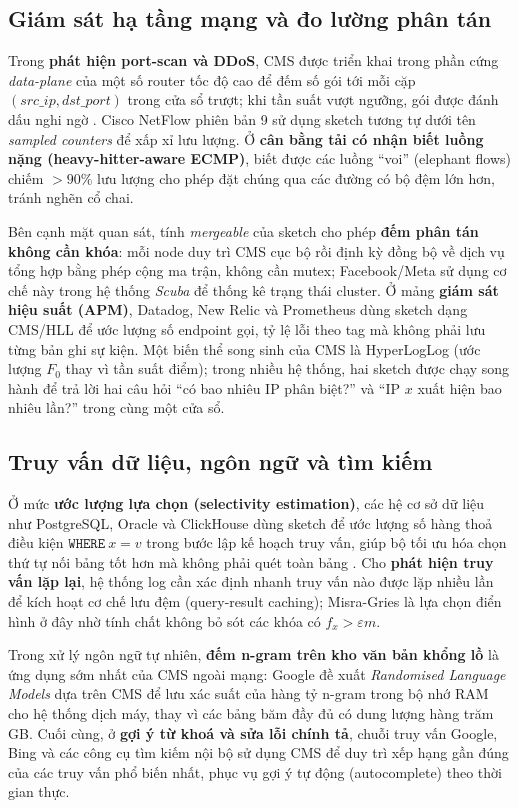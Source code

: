 \subsection{Giám sát hạ tầng mạng và đo lường phân tán}

Trong \textbf{phát hiện port-scan và DDoS}, CMS được triển khai trong phần cứng \textit{data-plane} của một số router tốc độ cao để đếm số gói tới mỗi cặp $(\textit{src\_ip}, \textit{dst\_port})$ trong cửa sổ trượt; khi tần suất vượt ngưỡng, gói được đánh dấu nghi ngờ \cite{estan2003conservative}. Cisco NetFlow phiên bản 9 sử dụng sketch tương tự dưới tên \textit{sampled counters} để xấp xỉ lưu lượng. Ở \textbf{cân bằng tải có nhận biết luồng nặng (heavy-hitter-aware ECMP)}, biết được các luồng ``voi'' (elephant flows) chiếm $>90\%$ lưu lượng cho phép đặt chúng qua các đường có bộ đệm lớn hơn, tránh nghẽn cổ chai.

Bên cạnh mặt quan sát, tính \textit{mergeable} của sketch cho phép \textbf{đếm phân tán không cần khóa}: mỗi node duy trì CMS cục bộ rồi định kỳ đồng bộ về dịch vụ tổng hợp bằng phép cộng ma trận, không cần mutex; Facebook/Meta sử dụng cơ chế này trong hệ thống \textit{Scuba} để thống kê trạng thái cluster. Ở mảng \textbf{giám sát hiệu suất (APM)}, Datadog, New Relic và Prometheus dùng sketch dạng CMS/HLL để ước lượng số endpoint gọi, tỷ lệ lỗi theo tag mà không phải lưu từng bản ghi sự kiện. Một biến thể song sinh của CMS là HyperLogLog (ước lượng $F_0$ thay vì tần suất điểm); trong nhiều hệ thống, hai sketch được chạy song hành để trả lời hai câu hỏi ``có bao nhiêu IP phân biệt?'' và ``IP $x$ xuất hiện bao nhiêu lần?'' trong cùng một cửa sổ.

\subsection{Truy vấn dữ liệu, ngôn ngữ và tìm kiếm}

Ở mức \textbf{ước lượng lựa chọn (selectivity estimation)}, các hệ cơ sở dữ liệu như PostgreSQL, Oracle và ClickHouse dùng sketch để ước lượng số hàng thoả điều kiện $\texttt{WHERE}\ x = v$ trong bước lập kế hoạch truy vấn, giúp bộ tối ưu hóa chọn thứ tự nối bảng tốt hơn mà không phải quét toàn bảng \cite{cormode2005cms}. Cho \textbf{phát hiện truy vấn lặp lại}, hệ thống log cần xác định nhanh truy vấn nào được lặp nhiều lần để kích hoạt cơ chế lưu đệm (query-result caching); Misra-Gries là lựa chọn điển hình ở đây nhờ tính chất không bỏ sót các khóa có $f_x > \varepsilon m$.

Trong xử lý ngôn ngữ tự nhiên, \textbf{đếm n-gram trên kho văn bản khổng lồ} là ứng dụng sớm nhất của CMS ngoài mạng: Google \cite{talbot2007randomised} đề xuất \textit{Randomised Language Models} dựa trên CMS để lưu xác suất của hàng tỷ n-gram trong bộ nhớ RAM cho hệ thống dịch máy, thay vì các bảng băm đầy đủ có dung lượng hàng trăm GB. Cuối cùng, ở \textbf{gợi ý từ khoá và sửa lỗi chính tả}, chuỗi truy vấn Google, Bing và các công cụ tìm kiếm nội bộ sử dụng CMS để duy trì xếp hạng gần đúng của các truy vấn phổ biến nhất, phục vụ gợi ý tự động (autocomplete) theo thời gian thực.

